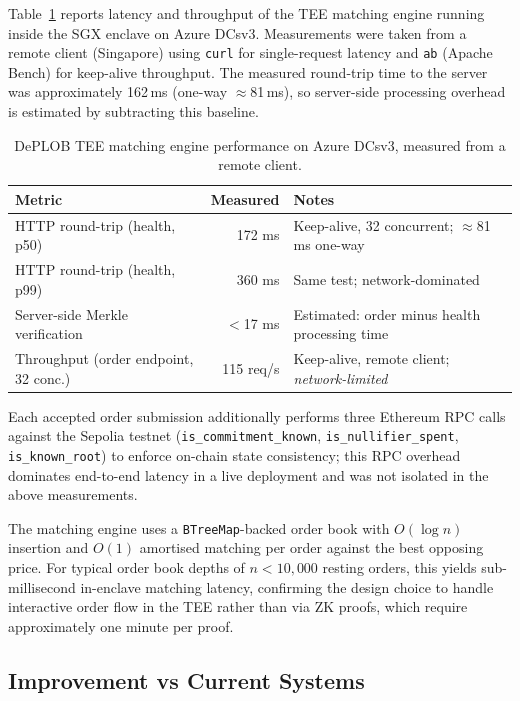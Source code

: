 \documentclass[12pt,a4paper]{article}
\begin{document}
Table~\ref{tab:tee_perf} reports latency and throughput of the TEE matching engine running inside the SGX enclave on Azure DCsv3. Measurements were taken from a remote client (Singapore) using \texttt{curl} for single-request latency and \texttt{ab} (Apache Bench) for keep-alive throughput. The measured round-trip time to the server was approximately 162\,ms (one-way $\approx$81\,ms), so server-side processing overhead is estimated by subtracting this baseline.

\begin{table}[H]
\centering
\begin{tabular}{|l|r|l|}
\hline
\textbf{Metric} & \textbf{Measured} & \textbf{Notes} \\
\hline
HTTP round-trip (health, p50) & 172 ms & Keep-alive, 32 concurrent; $\approx$81 ms one-way \\
\hline
HTTP round-trip (health, p99) & 360 ms & Same test; network-dominated \\
\hline
Server-side Merkle verification & $<$17 ms & Estimated: order minus health processing time \\
\hline
Throughput (order endpoint, 32 conc.) & 115 req/s & Keep-alive, remote client; \emph{network-limited} \\
\hline
\end{tabular}
\caption{DePLOB TEE matching engine performance on Azure DCsv3, measured from a remote client.}
\label{tab:tee_perf}
\end{table}

Each accepted order submission additionally performs three Ethereum RPC calls against the Sepolia testnet (\texttt{is\_commitment\_known}, \texttt{is\_nullifier\_spent}, \texttt{is\_known\_root}) to enforce on-chain state consistency; this RPC overhead dominates end-to-end latency in a live deployment and was not isolated in the above measurements.

The matching engine uses a \texttt{BTreeMap}-backed order book with $O(\log n)$ insertion and $O(1)$ amortised matching per order against the best opposing price. For typical order book depths of $n < 10{,}000$ resting orders, this yields sub-millisecond in-enclave matching latency, confirming the design choice to handle interactive order flow in the TEE rather than via ZK proofs, which require approximately one minute per proof.


\subsection{Improvement vs Current Systems}
\end{document}
